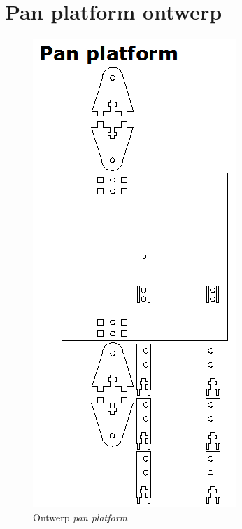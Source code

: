 \chapter{Pan platform ontwerp}
\label{app:pan}

\begin{figure}
    \includegraphics[scale=0.5]{figures/appendix/pan.png}
    \caption{Ontwerp \emph{pan platform}}
\end{figure}
